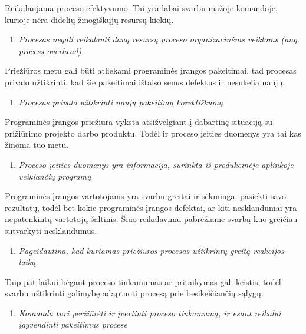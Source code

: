 \documentclass[12pt, a4paper, lithuanian, final]{article}
\begin{document}
Reikalaujama proceso efektyvumo. Tai yra labai svarbu mažoje komandoje, kurioje nėra didelių žmogiškųjų resursų kiekių.
\begin{enumerate}
	\setcounter{enumi}{\thereqList}
	\item \textit{Procesas negali reikalauti daug resursų proceso organizacinėms veikloms (ang. process overhead)}
	\setcounter{reqList}{\theenumi}
\end{enumerate}


Priežiūros metu gali būti atliekami programinės įrangos pakeitimai, tad procesas privalo užtikrinti, kad šie pakeitimai ištaiso senus defektus ir nesukelia naujų.
\begin{enumerate}
	\setcounter{enumi}{\thereqList}
	\item \textit{Procesas privalo užtikrinti naujų pakeitimų korektiškumą}
	\setcounter{reqList}{\theenumi}
\end{enumerate}


Programinės įrangos priežiūra vyksta atsižvelgiant į dabartinę situaciją su prižiūrimo projekto darbo produktu.
Todėl ir proceso įeities duomenys yra tai kas žinoma tuo metu.
\begin{enumerate}
	\setcounter{enumi}{\thereqList}
	\item \textit{Proceso įeities duomenys yra informacija, surinkta iš produkcinėje aplinkoje veikiančių programų}
	\setcounter{reqList}{\theenumi}
\end{enumerate}


Programinės įrangos vartotojams yra svarbu greitai ir sėkmingai pasiekti savo rezultatų, todėl bet kokie programinės įrangos defektai, ar kiti nesklandumai yra nepatenkintų vartotojų šaltinis.
Šiuo reikalavimu pabrėžiame svarbą kuo greičiau sutvarkyti nesklandumus.
\begin{enumerate}
	\setcounter{enumi}{\thereqList}
	\item \textit{Pageidautina, kad kuriamas priežiūros procesas užtikrintų greitą reakcijos laiką}
	\setcounter{reqList}{\theenumi}
\end{enumerate}


Taip pat laikui bėgant proceso tinkamumas ar pritaikymas gali keistis, todėl svarbu užtikrinti galimybę adaptuoti procesą prie besikeičiančių sąlygų.

\begin{enumerate}
	\setcounter{enumi}{\thereqList}
	\item \textit{Komanda turi peržiūrėti ir įvertinti proceso tinkamumą, ir esant reikalui įgyvendinti pakeitimus procese}
	\setcounter{reqList}{\theenumi}
\end{enumerate}
\end{document}
